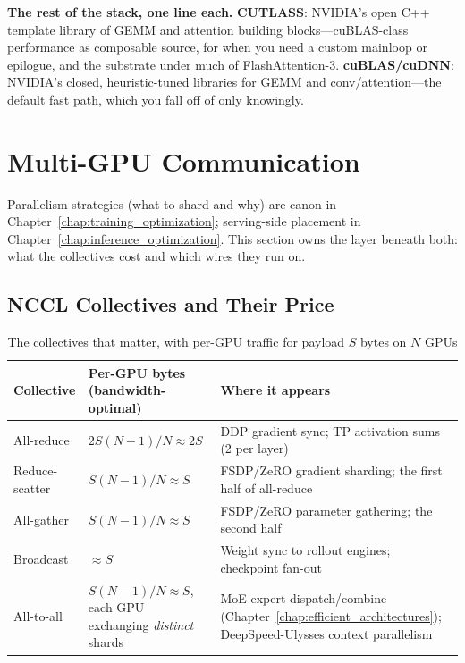 \textbf{The rest of the stack, one line each.} \textbf{CUTLASS}: NVIDIA's open C++ template library of GEMM and attention building blocks---cuBLAS-class performance as composable source, for when you need a custom mainloop or epilogue, and the substrate under much of FlashAttention-3. \textbf{cuBLAS/cuDNN}: NVIDIA's closed, heuristic-tuned libraries for GEMM and conv/attention---the default fast path, which you fall off of only knowingly.

\section{Multi-GPU Communication}
\label{sec:multi_gpu_comm}

Parallelism strategies (what to shard and why) are canon in Chapter~\ref{chap:training_optimization}; serving-side placement in Chapter~\ref{chap:inference_optimization}. This section owns the layer beneath both: what the collectives cost and which wires they run on.

\subsection{NCCL Collectives and Their Price}

\begin{table}[H]
\centering
\small
\caption{The collectives that matter, with per-GPU traffic for payload $S$ bytes on $N$ GPUs}
\label{tab:nccl_collectives}
\begin{tabularx}{\textwidth}{llX}
\toprule
\textbf{Collective} & \textbf{Per-GPU bytes (bandwidth-optimal)} & \textbf{Where it appears} \\
\midrule
All-reduce & $2S(N-1)/N \approx 2S$ & DDP gradient sync; TP activation sums (2 per layer) \\
Reduce-scatter & $S(N-1)/N \approx S$ & FSDP/ZeRO gradient sharding; the first half of all-reduce \\
All-gather & $S(N-1)/N \approx S$ & FSDP/ZeRO parameter gathering; the second half \\
Broadcast & $\approx S$ & Weight sync to rollout engines; checkpoint fan-out \\
All-to-all & $S(N-1)/N \approx S$, each GPU exchanging \textit{distinct} shards & MoE expert dispatch/combine (Chapter~\ref{chap:efficient_architectures}); DeepSpeed-Ulysses context parallelism \\
\bottomrule
\end{tabularx}
\end{table}

